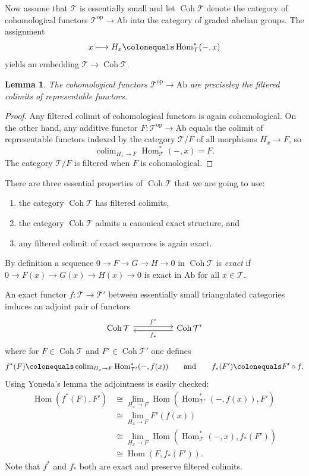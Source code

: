 \documentclass{amsart}[a4]
\newtheorem{lemma}[theorem]{Lemma}
\theoremstyle{definition}
\theoremstyle{remark}
\numberwithin{equation}{section}
\newcommand{\Coh}{\operatorname{Coh}}
\newcommand{\colim}{\operatorname{colim}}
\newcommand{\Hom}{\operatorname{Hom}}
\newcommand{\Ab}{\mathrm{Ab}}
\newcommand{\op}{\mathrm{op}}
\newcommand{\cat}{\mathcal}
\begin{document}
Now assume that $\cat T$ is essentially small and let $\Coh\cat T$
denote the category of cohomological functors $\cat T^\op\to\Ab$ into
the category of graded abelian groups. The assignment
\[x\longmapsto H_x\colonequals\Hom^*_\cat T(-,x)\] yields an embedding
$\cat T\to\Coh\cat T$.

\begin{lemma}
The cohomological functors $\cat T^\op\to\Ab$ are preciseley the
filtered colimits of representable functors.
\end{lemma}

\begin{proof}
  Any filtered colimit of cohomological functors is again
  cohomological. On the other hand, any additive functor $F\colon\cat T^\op\to\Ab$
  equals the colimit of representable functors indexed by the category
  $\cat T/F$ of all morphisms $H_x\to F$, so
\[\colim_{H_x\to F}\Hom^*_{\cat T}(-,x)=F.\]
The category $\cat T/F$ is filtered when $F$ is cohomological.
\end{proof}


There are three essential properties of $\Coh\cat T$ that we are going
to use:
\begin{enumerate}
\item the category  $\Coh\cat T$ has filtered colimits,
\item the category $\Coh\cat T$ admits a canonical exact structure,
  and
\item any filtered colimit of exact sequences is again exact.
\end{enumerate}
By definition a sequence $0\to F\to G\to H\to 0$ in $\Coh\cat T$ is
\emph{exact} if $0\to F(x)\to G(x)\to H(x)\to 0$ is exact in $\Ab$ for
all $x\in\cat T$. 


An exact functor $f\colon\cat T\to\cat T'$ between essentially small
triangulated categories induces an adjoint pair of functors
\begin{equation*}
\begin{tikzcd}
  \Coh\cat T \ar[rr,yshift=2.5,"f^*"] && \ar[ll,yshift=-2.5,"f_*"]
  \Coh\cat T'
\end{tikzcd}
\end{equation*}
where for $F\in\Coh\cat T$ and $F'\in\Coh\cat T'$ one defines
\[f^*(F)\colonequals\colim_{H_x\to F}\Hom^*_{\cat T'}(-,f(x))\qquad\text{and}\qquad
f_*(F')\colonequals F'\circ f.\]
Using Yoneda's lemma the adjointness is easily checked:
\begin{align*}
  \Hom(f^*(F),F')
  &\cong\lim_{H_x\to F}\Hom(\Hom^*_{\cat                T'}(-,f(x)),F')\\
  &\cong\lim_{H_x\to F} F'(f(x))\\
  &\cong\lim_{H_x\to F}\Hom(\Hom^*_{\cat T}(-,x),f_*(F'))\\
  &\cong\Hom(F,f_*(F')).
\end{align*}
Note that $f^*$ and $f_*$ both are exact and preserve filtered
colimits.
\end{document}
